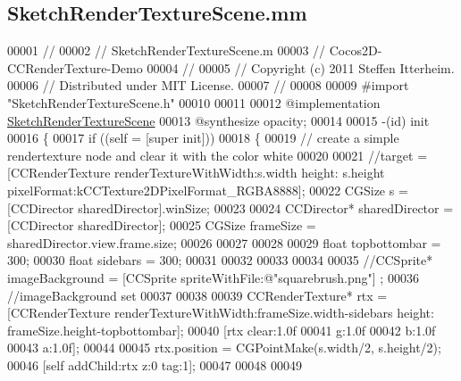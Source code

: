 \hypertarget{_sketch_render_texture_scene_8mm}{\subsection{Sketch\-Render\-Texture\-Scene.\-mm}
\label{d3/d58/_sketch_render_texture_scene_8mm}
}

\begin{DoxyCode}
00001 \textcolor{comment}{//}
00002 \textcolor{comment}{//  SketchRenderTextureScene.m}
00003 \textcolor{comment}{//  Cocos2D-CCRenderTexture-Demo}
00004 \textcolor{comment}{//}
00005 \textcolor{comment}{//  Copyright (c) 2011 Steffen Itterheim.}
00006 \textcolor{comment}{//  Distributed under MIT License.}
00007 \textcolor{comment}{//}
00008 
00009 \textcolor{preprocessor}{#import "SketchRenderTextureScene.h"}
00010 
00011 
00012 \textcolor{keyword}{@implementation }\hyperlink{interface_sketch_render_texture_scene}{SketchRenderTextureScene}
00013 \textcolor{keyword}{@synthesize} opacity;
00014 
00015 -(id) init
00016 \{
00017     \textcolor{keywordflow}{if} ((\textcolor{keyword}{self} = [super init])) 
00018     \{
00019         \textcolor{comment}{// create a simple rendertexture node and clear it with the color white}
00020         
00021         \textcolor{comment}{//target = [CCRenderTexture renderTextureWithWidth:s.width height: s.height
       pixelFormat:kCCTexture2DPixelFormat\_RGBA8888];}
00022         CGSize s = [CCDirector sharedDirector].winSize;
00023 
00024         CCDirector* sharedDirector =[CCDirector sharedDirector];
00025         CGSize frameSize = sharedDirector.view.frame.size;
00026         
00027         
00028         
00029         \textcolor{keywordtype}{float} topbottombar = 300;
00030         \textcolor{keywordtype}{float} sidebars = 300;
00031 
00032         
00033         
00034         
00035         \textcolor{comment}{//CCSprite* imageBackground = [CCSprite spriteWithFile:@"squarebrush.png"] ;}
00036         \textcolor{comment}{//imageBackground set}
00037 
00038         
00039         CCRenderTexture* rtx = [CCRenderTexture renderTextureWithWidth:frameSize.width-sidebars height: 
      frameSize.height-topbottombar];
00040         [rtx clear:1.0f 
00041                  g:1.0f
00042                  b:1.0f
00043                  a:1.0f];
00044         
00045         rtx.position = CGPointMake(s.width/2, s.height/2);
00046         [\textcolor{keyword}{self} addChild:rtx z:0 tag:1];
00047         
00048         
00049         

\end{DoxyCode}
